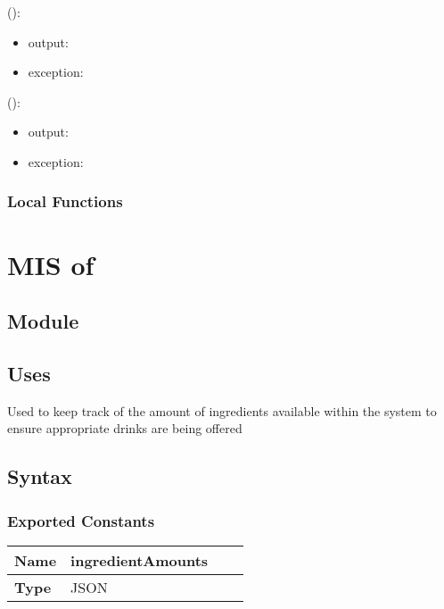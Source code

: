 \documentclass[12pt, titlepage]{article}
\begin{document}
\noindent {}():
\begin{itemize}
\item output:  
\item exception:  
\end{itemize}

\noindent {}():
\begin{itemize}
\item output:  
\item exception:  
\end{itemize}

\subsubsection{Local Functions}

 
  
\newpage

\section{MIS of } \label{Module}

\subsection{Module}


\subsection{Uses}
Used to keep track of the amount of ingredients available within the system to ensure appropriate drinks are being offered

\subsection{Syntax}

\subsubsection{Exported Constants}
\begin{center}
\begin{tabular}{p{2cm} p{4cm} p{4cm} p{2cm}}
\hline
\textbf{Name} & ingredientAmounts \\
\hline
\textbf{Type} & JSON \\
\hline
\end{tabular}
\end{center}
\end{document}
